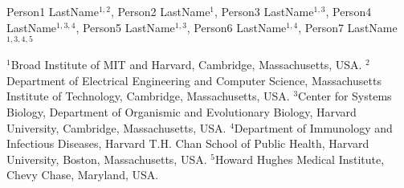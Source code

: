 \mbox{Person1} \mbox{LastName}$^{1,2}$,
\mbox{Person2} \mbox{LastName}$^{1}$,
\mbox{Person3} \mbox{LastName}$^{1,3}$,
\mbox{Person4} \mbox{LastName}$^{1,3,4}$,
\mbox{Person5} \mbox{LastName}$^{1,3}$,
\mbox{Person6} \mbox{LastName}$^{1,4}$,
\mbox{Person7} \mbox{LastName}$^{1,3,4,5}$


$^{1}$Broad Institute of MIT and Harvard, Cambridge, Massachusetts, USA.
$^{2}$Department of Electrical Engineering and Computer Science, Massachusetts Institute of Technology, Cambridge, Massachusetts, USA.
$^{3}$Center for Systems Biology, Department of Organismic and Evolutionary Biology, Harvard University, Cambridge, Massachusetts, USA.
$^{4}$Department of Immunology and Infectious Diseases, Harvard T.H. Chan School of Public Health, Harvard University, Boston, Massachusetts, USA.
$^{5}$Howard Hughes Medical Institute, Chevy Chase, Maryland, USA.
